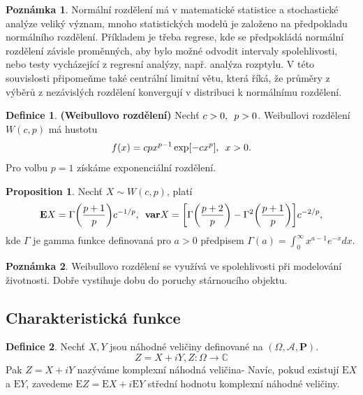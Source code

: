 \documentclass[a4]{report}
\theoremstyle{definition}
\newtheorem{definition}{Definice}[section]
\newtheorem{remark}{Poznámka}[section]
\newtheorem{proposition}{Proposition}[section]
\begin{document}
{\begin{remark}
Normální rozdělení má v matematické statistice a stochastické analýze veliký význam, mnoho statistických modelů je založeno na předpokladu normálního rozdělení. Příkladem je třeba regrese, kde se předpokládá normální rozdělení závisle proměnných, aby bylo možné odvodit intervaly spolehlivosti, nebo testy vycházející z regresní analýzy, např. analýza rozptylu. V této souvislosti připomeňme také centrální limitní větu, která říká, že průměry z výběrů z nezávislých rozdělení konvergují v distribuci k normálnímu rozdělení.
\end{remark}

\begin{definition}{\textbf{(Weibullovo rozdělení)}}
Nechť $c > 0, \enskip p > 0$. Weibullovi rozdělení $W(c, p)$ má hustotu
\begin{equation}
f(x) = cpx^{p-1}\exp[-cx^{p}], \enskip x > 0.
\end{equation}
Pro volbu $p = 1$ získáme exponenciální rozdělení.
\end{definition}

\begin{proposition}
Nechť $X \sim W(c, p)$, platí
\begin{equation}
\mathbf{E}X = \Gamma\bigg( \frac{p + 1}{p} \bigg) c^{-1/p}, \enskip \mathbf{var}X = \bigg[ \Gamma \bigg( \frac{p+2}{p}\bigg) - \Gamma^{2} \bigg( \frac{p + 1}{p}\bigg) \bigg] c^{-2/p}, 
\end{equation}
kde $\Gamma$ je gamma funkce definovaná pro $a>0$ předpisem $\Gamma(a) = \int_{0}^{\infty} x^{a - 1}e^{-x}dx.$
\end{proposition}

\begin{remark}
Weibullovo rozdělení se využívá ve spolehlivosti při modelování životnosti. Dobře vystihuje dobu do poruchy stárnoucího objektu.
\end{remark}







\subsection{Charakteristická funkce}
\begin{definition}
Nechť $X,Y$ jsou náhodné veličiny definované na $(\Omega,\mathcal{A},\textbf{P})$.\begin{equation}
Z=X+iY, Z:\Omega\rightarrow\mathbb{C}
\end{equation}
Pak $Z=X+iY$ nazýváme komplexní náhodná veličina- Navíc, pokud existují $\mathrm{E}X$ a $\mathrm{E}Y$, zavedeme $\mathrm{E}Z=\mathrm{E}X+i\mathrm{E}Y$ střední hodnotu komplexní náhodné veličiny.
\end{definition}


}
\end{document}
